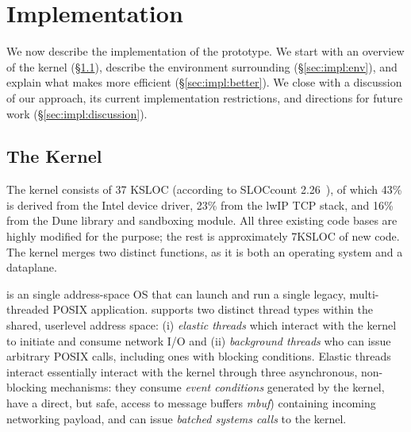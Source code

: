 
\section{Implementation}
\label{sec:impl}






We now describe the implementation of the \ix prototype.  We start
with an overview of the \ix kernel (\S\ref{sec:impl:kernel}), describe
the environment surrounding \ix (\S\ref{sec:impl:env}), and explain
what makes \ix more efficient (\S\ref{sec:impl:better}).
We close with a
discussion of our approach, its current implementation restrictions,
and directions for future work (\S\ref{sec:impl:discussion}).




\subsection{The \ix Kernel}
\label{sec:impl:kernel}



The \ix kernel consists of 37 KSLOC (according to SLOCcount
2.26~\cite{url:sloccount}), of which 43\% is derived from the Intel
device driver, 23\% from the lwIP TCP stack, and 16\% from the Dune
library and sandboxing module.  All three existing code bases are
highly modified for the purpose; the rest is approximately 7KSLOC of
new code.  The \ix kernel merges two distinct functions, as it is both
an operating system and a dataplane.

 \ix is an single address-space OS that can launch and run a single
legacy, multi-threaded POSIX application. \ix supports two distinct
thread types within the shared, userlevel address space: (i)
\emph{elastic threads} which interact with the \ix kernel to initiate
and consume network I/O and (ii) \emph{background threads} who can
issue arbitrary POSIX calls, including ones with blocking conditions.
Elastic threads interact essentially interact with the kernel through
three asynchronous, non-blocking mechanisms: they consume \emph{event
  conditions} generated by the kernel, have a direct, but safe, access
to message buffers \emph{mbuf}) containing incoming networking
payload, and can issue \emph{batched systems calls} to the kernel.

